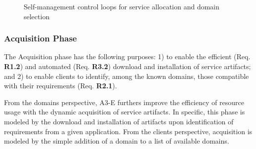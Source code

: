 \begin{figure}[tbp]
	\centering
	\captionsetup[subfigure]{width=0.4\textwidth}	
	\null\hfill
	\captionsetup[subfigure]{width=0.4\textwidth}	
	\hfill
	\hfill\null
	\caption{Self-management control loops for service allocation and domain selection}\label{fig:allocation-loops}
\end{figure}

\subsubsection*{Acquisition Phase}\label{sec:A3-E-acquisition}

The Acquisition phase has the following purposes: 1) to enable the efficient (Req. \textbf{R1.2}) and automated (Req. \textbf{R3.2}) download and installation of service artifacts; and 2) to enable clients to identify, among the known domains, those compatible with their requirements (Req. \textbf{R2.1}).

From the domains perspective, A3-E furthers improve the efficiency of resource usage with the dynamic acquisition of service artifacts. In specific, this phase is modeled by the download and installation of artifacts upon identification of requirements from a given application. 
From the clients perspective, acquisition is modeled by the simple addition of a domain to a list of available domains.

